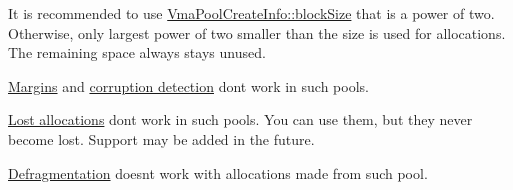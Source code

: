 \begin{DoxyItemize}
\item It is recommended to use \hyperlink{structVmaPoolCreateInfo_aa4265160536cdb9be821b7686c16c676}{Vma\+Pool\+Create\+Info\+::block\+Size} that is a power of two. Otherwise, only largest power of two smaller than the size is used for allocations. The remaining space always stays unused.
\item \hyperlink{debugging_memory_usage_debugging_memory_usage_margins}{Margins} and \hyperlink{debugging_memory_usage_debugging_memory_usage_corruption_detection}{corruption detection} don\textquotesingle{}t work in such pools.
\item \hyperlink{lost_allocations}{Lost allocations} don\textquotesingle{}t work in such pools. You can use them, but they never become lost. Support may be added in the future.
\item \hyperlink{defragmentation}{Defragmentation} doesn\textquotesingle{}t work with allocations made from such pool. 
\end{DoxyItemize}